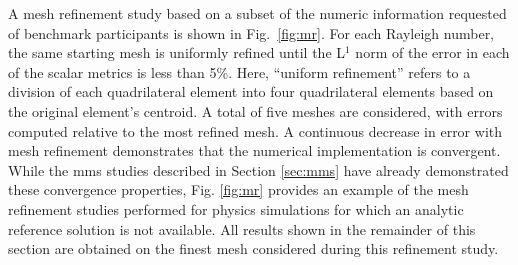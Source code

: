 \noindent A mesh refinement study based on a subset of the numeric information requested of benchmark participants is shown in Fig.\ \ref{fig:mr}. For each Rayleigh number, the same starting mesh is uniformly refined until the L$^1$ norm of the error in each of the scalar metrics is less than 5\%. Here, ``uniform refinement'' refers to a division of each quadrilateral element into four quadrilateral elements based on the original element's centroid. A total of five meshes are considered, with errors computed relative to the most refined mesh. A continuous decrease in error with mesh refinement demonstrates that the numerical implementation is convergent. While the \gls{mms} studies described in Section \ref{sec:mms} have already demonstrated these convergence properties, Fig. \ref{fig:mr} provides an example of the mesh refinement studies performed for physics simulations for which an analytic reference solution is not available. All results shown in the remainder of this section are obtained on the finest mesh considered during this refinement study.


